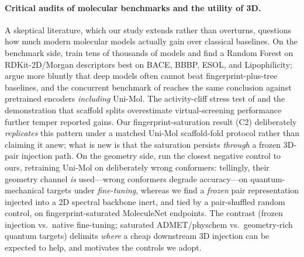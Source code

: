 \documentclass[sigconf,nonacm,anonymous,review]{acmart}
\begin{document}
\paragraph{Critical audits of molecular benchmarks and the utility of 3D.}
A skeptical literature, which our study extends rather than overturns, questions how much modern molecular models actually gain over classical baselines. On the benchmark side, \citet{deng2023systematic} train tens of thousands of models and find a Random Forest on RDKit-2D/Morgan descriptors best on BACE, BBBP, ESOL, and Lipophilicity; \citet{xia2023whydeep} argue more bluntly that deep models often cannot beat fingerprint-plus-tree baselines, and the concurrent benchmark of \citet{praski2025embedding} reaches the same conclusion against pretrained encoders \emph{including} Uni-Mol. The activity-cliff stress test of \citet{vantilborg2022cliffs} and the demonstration that scaffold splits overestimate virtual-screening performance \citep{guo2024scaffold} further temper reported gains. Our fingerprint-saturation result (C2) deliberately \emph{replicates} this pattern under a matched Uni-Mol scaffold-fold protocol rather than claiming it anew; what is new is that the saturation persists \emph{through} a frozen 3D-pair injection path. On the geometry side, \citet{hamakawa2025conformation} run the closest negative control to ours, retraining Uni-Mol on deliberately wrong conformers: tellingly, their geometry channel \emph{is} used---wrong conformers degrade accuracy---on quantum-mechanical targets under \emph{fine-tuning}, whereas we find a \emph{frozen} pair representation injected into a 2D spectral backbone inert, and tied by a pair-shuffled random control, on fingerprint-saturated MoleculeNet endpoints. The contrast (frozen injection vs.\ native fine-tuning; saturated ADMET/physchem vs.\ geometry-rich quantum targets) delimits \emph{where} a cheap downstream 3D injection can be expected to help, and motivates the controls we adopt.
\end{document}
